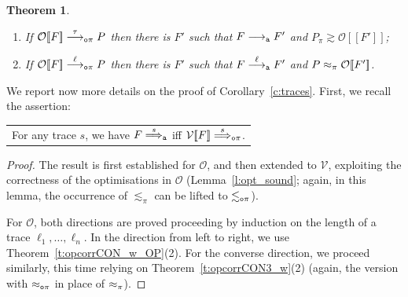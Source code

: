 \documentclass[11pt,a4paper]{amsart}
\theoremstyle{plain}
\theoremstyle{definition}
\theoremstyle{defC}
\theoremstyle{thmC}
\theoremstyle{plain}
\numberwithin{equation}{section}
\def\finish#1{\vskip.2cm\noindent{\em #1}%
  \marginpar{$\longleftarrow$}\vskip.2cm}
\newcommand{\finish}[1]{}
\newcommand{\rmm}[1]{{\tt{\lowercase{#1}}}}
\newcommand{\genarr}[2]{\mathrel{\stackrel{{#1}}{\longrightarrow}_{\rmm{\lowercase{#2}}}}}
\newcommand{\genArr}[2]{\mathrel{\stackrel{{#1}}{\Longrightarrow}_{\rmm{\lowercase{#2}}}}}  %
\newcommand{\genlongrightarrow}[1]{\mathrel{\longrightarrow_{\rmm{\lowercase{#1}}}}}
\newcommand{\arrA}[1]{\genarr{#1}{A}}  %
\newcommand{\ArrA}[1]{\genArr{#1}{A}}  %
\newcommand{\longrightarrowA}{\genlongrightarrow{A}}
\newcommand{\arrN}[1]{\genarr{#1}{o\pi}}  %
\newcommand{\ArrN}[1]{\genArr{#1}{o\pi}}  %
\newcommand{\arr}[1]{\mathrel{\stackrel{{#1}}{\longrightarrow}}}  %
\newcommand{\genwb}[1]{\mathrel{\approx_{\rmm{\lowercase{#1}}}}}       %
\newcommand{\wbPI}{\genwb{\pi}}       %
\newcommand{\wbOPI}{\genwb{o\pi}}       %
\newcommand{\contr}{\mathrel{\mbox{}_{\pi}\!\!\gtrsim}}
\newcommand{\expa}{\mathrel{\lesssim_{\pi}}}
\newcommand{\expaOP}{\mathrel{\lesssim_{\rmm{o}\pi}}} %
\newcommand{\FF}{F}
\newcommand{\PP}{P}
\newcommand{\cbvSymb}{{\mathcal {V}}}
\newcommand{\encoEnvI}[1]{ \cbvSymb[\! [ #1 ] \! ]  } %
\newcommand{\encoEnvV}[1]{{\mathcal {O}} [\! [ #1 ] \! ]  } %
\newcommand{\encoConV}{\encoEnvV} %
\newcommand{\qencV}{{\mathcal O}}  %
\newcommand{\Intp}{\mbox{I$\pi$}\xspace}   %
\newcommand{\piI}{\Intp}   %
\newcommand{\initName}{}
\theoremstyle{plain}
\newtheorem{theorem}[thm]{Theorem}
\theoremstyle{definition}
\begin{document}
\begin{theorem} %
\label{t:opcorrCON3}
$ $ \begin{enumerate}

\item If 
$ \encoConV \FF \arrN \tau \PP$ then there is $\FF'$ such that 
$\FF \longrightarrowA \FF'$  and  
$\PP   \contr \encoConV {\FF'}$; 


\item If
$ \encoConV \FF \arrN\ell \PP$
 then there is $\FF'$ such that
 $\FF \arrA\ell \FF'$
and $\PP \wbPI \encoConV {\FF'}$.
\end{enumerate} 
\end{theorem} 
\noindent
We report now more details on the proof of Corollary~\ref{c:traces}.
First, we recall the assertion:

\begin{center}
\begin{tabular}{l}
For any trace $s$, we have 
  $\FF \ArrA s$   iff 
 $ \encoEnvI \FF  \ArrN s$.
\end{tabular} 
\end{center} 


\begin{proof}
The result is first established for 
 $\qencV$, and then extended to 
$\cbvSymb$,  exploiting the correctness of the optimisations 
in  $\qencV$ (Lemma~\ref{l:opt_sound}; again, in this lemma, the occurrence of $\expa$
can be lifted to $\expaOP$).

For  $\qencV$, 
both directions are proved proceeding by induction on the length of a trace 
 $\ell_1, \ldots,   \ell_n $.  
In the direction from left to right, we use 
 Theorem~\ref{t:opcorrCON_w_OP}(2). 
For the converse direction, we 
proceed similarly, this time relying on 
Theorem~\ref{t:opcorrCON3_w}(2) 
 (again, the version with $\wbOPI$ in place of 
 $\wbPI$).
 \end{proof} 
\end{document}
